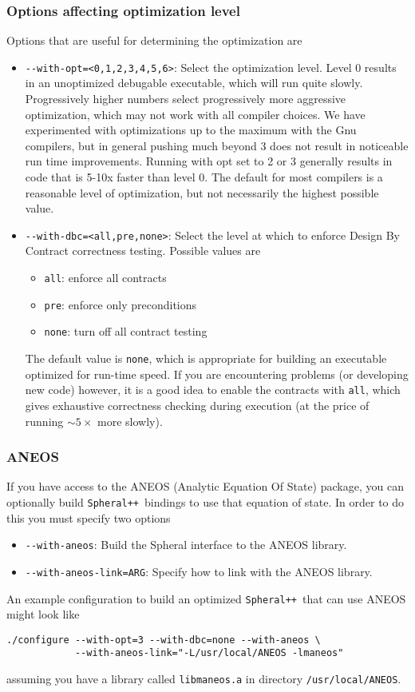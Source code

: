 \documentclass{article}
\newcommand{\Spheral}{{\tt Spheral++}}
\begin{document}
\subsubsection{Options affecting optimization level}
Options that are useful for determining the optimization are
\begin{itemize}
\item \verb+--with-opt=<0,1,2,3,4,5,6>+: Select the optimization level.  Level 0
results in an unoptimized debugable executable, which will run quite slowly.
Progressively higher numbers select progressively more aggressive optimization,
which may not work with all compiler choices.  We have experimented with
optimizations up to the maximum with the Gnu compilers, but in general pushing
much beyond 3 does not result in noticeable run time improvements.  Running with
opt set to 2 or 3 generally results in code that is 5-10x faster than level 0.
The default for most compilers is a reasonable level of optimization, but not
necessarily the highest possible value.
\item \verb+--with-dbc=<all,pre,none>+: Select the level at which to enforce
Design By Contract correctness testing.  Possible values are
\begin{itemize}
\item \verb+all+: enforce all contracts
\item \verb+pre+: enforce only preconditions
\item \verb+none+: turn off all contract testing
\end{itemize}
The default value is \verb+none+, which is appropriate for building an
executable optimized for run-time speed.  If you are encountering problems (or
developing new code) however, it is a good idea to enable the contracts with
\verb+all+, which gives exhaustive correctness checking during execution (at the
price of running $\sim 5\times$ more slowly).
\end{itemize}

\subsubsection{ANEOS}
If you have access to the ANEOS (Analytic Equation Of State) package, you can
optionally build \Spheral\ bindings to use that equation of state.  In order to
do this you must specify two options
\begin{itemize}
\item \verb+--with-aneos+: Build the Spheral interface to the ANEOS library.
\item \verb+--with-aneos-link=ARG+: Specify how to link with the ANEOS library.
\end{itemize}
An example configuration to build an optimized \Spheral\ that can use ANEOS
might look like
\begin{verbatim}
./configure --with-opt=3 --with-dbc=none --with-aneos \
            --with-aneos-link="-L/usr/local/ANEOS -lmaneos"
\end{verbatim}
assuming you have a library called \verb+libmaneos.a+ in directory
\verb+/usr/local/ANEOS+.
\end{document}
